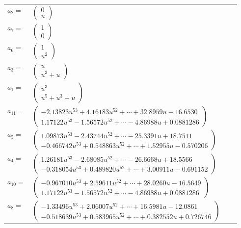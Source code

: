 \documentclass[1p]{elsarticle_modified}
\theoremstyle{definition}
\begin{document}
\begin{tabular}{m{7pt} m{180pt} m{7pt} m{180pt} }
\flushright $a_{2}=$&$\begin{pmatrix}0\\u\end{pmatrix}$ \\
\flushright $a_{7}=$&$\begin{pmatrix}1\\0\end{pmatrix}$ \\
\flushright $a_{6}=$&$\begin{pmatrix}1\\u^2\end{pmatrix}$ \\
\flushright $a_{3}=$&$\begin{pmatrix}u\\u^3+u\end{pmatrix}$ \\
\flushright $a_{1}=$&$\begin{pmatrix}u^3\\u^5+u^3+u\end{pmatrix}$ \\
\flushright $a_{11}=$&$\begin{pmatrix}-2.13823 u^{53}+4.16183 u^{52}+\cdots+32.8959 u-16.6530\\1.17122 u^{53}-1.56572 u^{52}+\cdots-4.86988 u+0.0881286\end{pmatrix}$ \\
\flushright $a_{5}=$&$\begin{pmatrix}1.09873 u^{53}-2.43744 u^{52}+\cdots-25.3391 u+18.7511\\-0.466742 u^{53}+0.548863 u^{52}+\cdots+1.52955 u-0.570206\end{pmatrix}$ \\
\flushright $a_{4}=$&$\begin{pmatrix}1.26181 u^{53}-2.68085 u^{52}+\cdots-26.6668 u+18.5566\\-0.318054 u^{53}+0.489820 u^{52}+\cdots+3.00911 u-0.691152\end{pmatrix}$ \\
\flushright $a_{10}=$&$\begin{pmatrix}-0.967010 u^{53}+2.59611 u^{52}+\cdots+28.0260 u-16.5649\\1.17122 u^{53}-1.56572 u^{52}+\cdots-4.86988 u+0.0881286\end{pmatrix}$ \\
\flushright $a_{8}=$&$\begin{pmatrix}-1.33496 u^{53}+2.06007 u^{52}+\cdots+16.5981 u-12.0861\\-0.518639 u^{53}+0.583965 u^{52}+\cdots+0.382552 u+0.726746\end{pmatrix}$ \\

\end{tabular}
\end{document}
